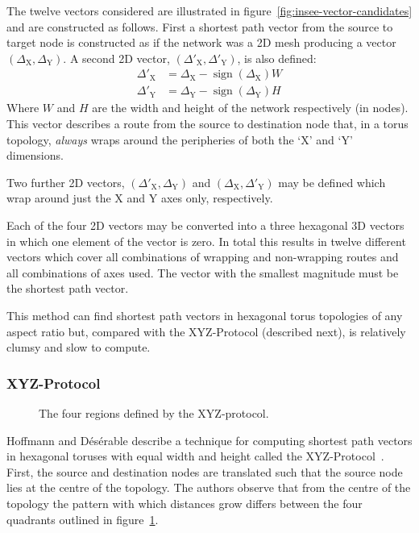				The twelve vectors considered are illustrated in
				figure~\ref{fig:insee-vector-candidates} and are constructed as
				follows.  First a shortest path vector from the source to target node
				is constructed as if the network was a 2D mesh producing a vector
				$(\Delta_\textrm{X},\Delta_\textrm{Y})$. A second 2D vector,
				$(\Delta'_\textrm{X},\Delta'_\textrm{Y})$, is also defined:
				\begin{align*}
					\Delta'_\textrm{X} &= \Delta_\textrm{X} - \operatorname{sign}(\Delta_\textrm{X})W
					\\
					\Delta'_\textrm{Y} &= \Delta_\textrm{Y} - \operatorname{sign}(\Delta_\textrm{Y})H
				\end{align*}
				Where $W$ and $H$ are the width and height of the network respectively
				(in nodes). This vector describes a route from the source to
				destination node that, in a torus topology, \emph{always} wraps around
				the peripheries of both the `X' and `Y' dimensions.
				
				Two further 2D vectors, $(\Delta'_\textrm{X},\Delta_\textrm{Y})$ and
				$(\Delta_\textrm{X},\Delta'_\textrm{Y})$ may be defined which wrap around
				just the X and Y axes only, respectively.
				
				Each of the four 2D vectors may be converted into a three hexagonal 3D
				vectors in which one element of the vector is zero. In total this
				results in twelve different vectors which cover all combinations of
				wrapping and non-wrapping routes and all combinations of axes used. The
				vector with the smallest magnitude must be the shortest path vector.
				
				This method can find shortest path vectors in hexagonal torus
				topologies of any aspect ratio but, compared with the XYZ-Protocol
				(described next), is relatively clumsy and slow to compute.
			
			\subsubsection{XYZ-Protocol}
				
				\begin{figure}
					\center
					
					\caption{The four regions defined by the XYZ-protocol.}
					\label{fig:xyz-protocol-regions}
				\end{figure}
			
				Hoffmann and D\'es\'erable describe a technique for computing shortest
				path vectors in hexagonal toruses with equal width and height called
				the XYZ-Protocol~\cite{hoffmann15,hoffmann11}. First, the source and
				destination nodes are translated such that the source node lies at the
				centre of the topology. The authors observe that from the centre of the
				topology the pattern with which distances grow differs between the four
				quadrants outlined in figure~\ref{fig:xyz-protocol-regions}.
				
